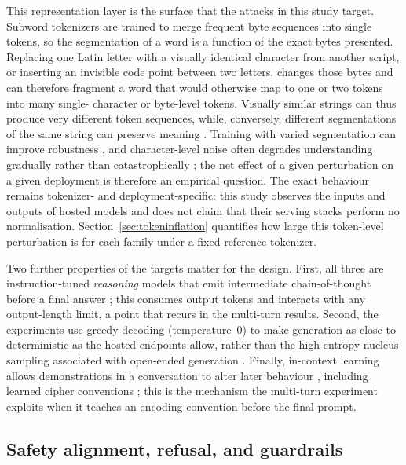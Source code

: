 \documentclass[a4paper,12pt]{article}
\begin{document}
This representation layer is the surface that the attacks in this study target.
Subword tokenizers are trained to merge frequent byte sequences into single tokens,
so the segmentation of a word is a function of the exact bytes presented. Replacing
one Latin letter with a visually identical character from another script, or inserting
an invisible code point between two letters, changes those bytes and can therefore
fragment a word that would otherwise map to one or two tokens into many single-
character or byte-level tokens. Visually similar strings can thus produce very
different token sequences, while, conversely, different segmentations of the same
string can preserve meaning \cite{geh2025advtok}. Training with varied segmentation
can improve robustness \cite{kudo2018subword,provilkov2020bpedropout}, and
character-level noise often degrades understanding gradually rather than
catastrophically \cite{belinkov2018synthetic}; the net effect of a given perturbation
on a given deployment is therefore an empirical question. The exact behaviour remains
tokenizer- and deployment-specific: this study observes the inputs and outputs of
hosted models and does not claim that their serving stacks perform no normalisation.
Section~\ref{sec:tokeninflation} quantifies how large this token-level perturbation is
for each family under a fixed reference tokenizer.

Two further properties of the targets matter for the design. First, all three are
instruction-tuned \emph{reasoning} models that emit intermediate chain-of-thought
before a final answer \cite{deepseek2025r1}; this consumes output tokens and interacts
with any output-length limit, a point that recurs in the multi-turn results. Second,
the experiments use greedy decoding (temperature~0) to make generation as close to
deterministic as the hosted endpoints allow, rather than the high-entropy nucleus
sampling associated with open-ended generation \cite{holtzman2020degeneration}.
Finally, in-context learning \cite{brown2020gpt3} allows demonstrations in a
conversation to alter later behaviour \cite{wei2023ica}, including learned cipher
conventions \cite{yuan2024cipherchat}; this is the mechanism the multi-turn experiment
exploits when it teaches an encoding convention before the final prompt.

\subsection{Safety alignment, refusal, and guardrails}
\end{document}

